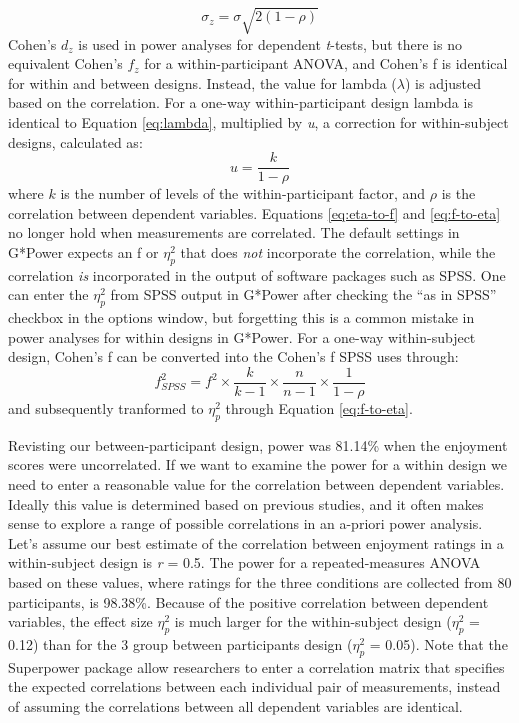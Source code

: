 \documentclass[
  ,jou,floatsintext]{apa6}
\begin{document}
\begin{equation}
\sigma_{z}=\sigma\sqrt{2(1-\rho)}
\end{equation}
Cohen's \(d_z\) is used in power analyses for dependent \emph{t}-tests, but there is no equivalent Cohen's \(f_z\) for a within-participant ANOVA, and Cohen's f is identical for within and between designs.
Instead, the value for lambda (\(\lambda\)) is adjusted based on the correlation.
For a one-way within-participant design lambda is identical to Equation \eqref{eq:lambda}, multiplied by \emph{u}, a correction for within-subject designs, calculated as:
\begin{equation}
u = \frac{k}{1-\rho}
\end{equation}
where \(k\) is the number of levels of the within-participant factor, and \(\rho\) is the correlation between dependent variables.
Equations \eqref{eq:eta-to-f} and \eqref{eq:f-to-eta} no longer hold when measurements are correlated.
The default settings in G*Power expects an f or \(\eta_p^2\) that does \emph{not} incorporate the correlation, while the correlation \emph{is} incorporated in the output of software packages such as SPSS.
One can enter the \(\eta_p^2\) from SPSS output in G*Power after checking the \enquote{as in SPSS} checkbox in the options window, but forgetting this is a common mistake in power analyses for within designs in G*Power.
For a one-way within-subject design, Cohen's f can be converted into the Cohen's f SPSS uses through:
\begin{equation}
f^2_{SPSS} = f^2 \times \frac{k}{k-1} \times \frac{n}{n-1} \times \frac{1}{1-\rho}
\end{equation}
and subsequently tranformed to \(\eta_p^2\) through Equation \eqref{eq:f-to-eta}.

Revisting our between-participant design, power was 81.14\% when the enjoyment scores were uncorrelated.
If we want to examine the power for a within design we need to enter a reasonable value for the correlation between dependent variables.
Ideally this value is determined based on previous studies, and it often makes sense to explore a range of possible correlations in an a-priori power analysis.
Let's assume our best estimate of the correlation between enjoyment ratings in a within-subject design is \emph{r} = 0.5.
The power for a repeated-measures ANOVA based on these values, where ratings for the three conditions are collected from 80 participants, is 98.38\%.
Because of the positive correlation between dependent variables, the effect size \(\eta_p^2\) is much larger for the within-subject design (\(\eta_p^2\) = 0.12) than for the 3 group between participants design (\(\eta_p^2\) = 0.05).
Note that the Superpower package allow researchers to enter a correlation matrix that specifies the expected correlations between each individual pair of measurements, instead of assuming the correlations between all dependent variables are identical.
\end{document}
